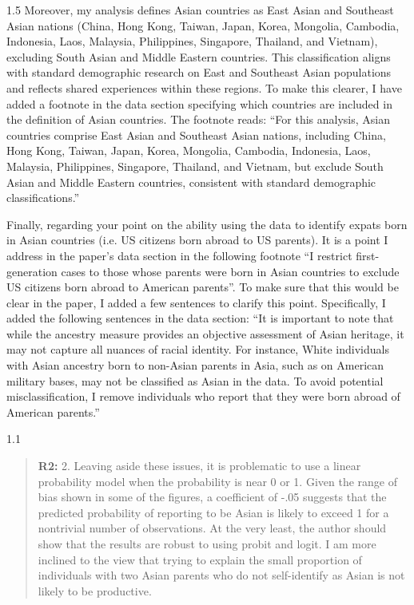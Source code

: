 \documentclass[12pt,english]{article}
\newcommand{\rrquote}{1.1}
\newcommand{\rrxspc}{1.5}
\begin{document}
\begin{refsection}
\begin{spacing}{\rrxspc}
            Moreover, my analysis defines Asian countries as East Asian and Southeast Asian nations (China, Hong Kong, Taiwan, Japan, Korea, Mongolia, Cambodia, Indonesia, Laos, Malaysia, Philippines, Singapore, Thailand, and Vietnam), excluding South Asian and Middle Eastern countries. This classification aligns with standard demographic research on East and Southeast Asian populations and reflects shared experiences within these regions. To make this clearer, I have added a footnote in the data section specifying which countries are included in the definition of Asian countries. The footnote reads: ``For this analysis, Asian countries comprise East Asian and Southeast Asian nations, including China, Hong Kong, Taiwan, Japan, Korea, Mongolia, Cambodia, Indonesia, Laos, Malaysia, Philippines, Singapore, Thailand, and Vietnam, but exclude South Asian and Middle Eastern countries, consistent with standard demographic classifications.''


            Finally, regarding your point on the ability using the data to identify expats born in Asian countries (i.e. US citizens born abroad to US parents). It is a point I address in the paper's data section in the following footnote ``I restrict first-generation cases to those whose parents were born in Asian countries to exclude US citizens born abroad to American parents''. To make sure that this would be clear in the paper, I added a few sentences to clarify this point. Specifically, I added the following sentences in the data section: ``It is important to note that while the ancestry measure provides an objective assessment of Asian heritage, it may not capture all nuances of racial identity. For instance, White individuals with Asian ancestry born to non-Asian parents in Asia, such as on American military bases, may not be classified as Asian in the data. To avoid potential misclassification, I remove individuals who report that they were born abroad of American parents.''

    \end{spacing}

    \begin{spacing}{\rrquote}
        \begin{quotation}
        \textbf{R2: } 2. Leaving aside these issues, it is problematic to use a linear probability model when the probability is near 0 or 1. Given the range of bias shown in some of the figures, a coefficient of -.05 suggests that the predicted probability of reporting to be Asian is likely to exceed 1 for a nontrivial number of observations. At the very least, the author should show that the results are robust to using probit and logit. I am more inclined to the view that trying to explain the small proportion of individuals with two Asian parents who do not self-identify as Asian is not likely to be productive.
        \end{quotation}
        \end{spacing}
        

\end{refsection}
\end{document}
